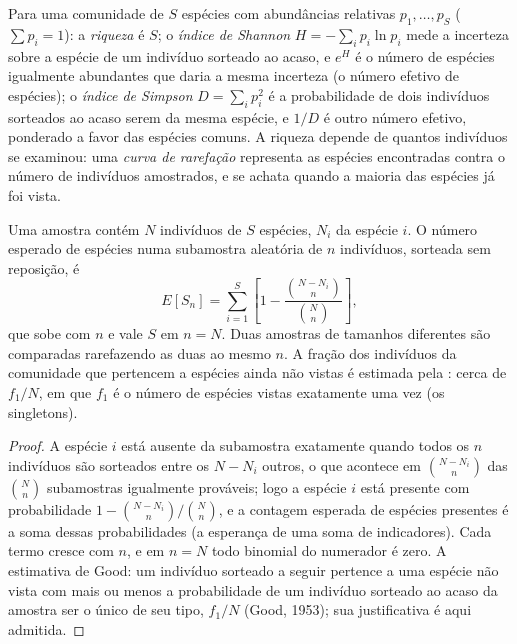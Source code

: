 \begin{definition}[Diversidade]\label{def:b3:microbiomes:diversity}
Para uma comunidade de $S$ espécies com abundâncias relativas
$p_{1},\dots,
p_{S}$ ($\sum p_{i} = 1$): a \emph{riqueza} é $S$; o
\emph{índice de Shannon} $H = -\sum_{i} p_{i}\ln p_{i}$ mede a
incerteza sobre a espécie de um indivíduo sorteado ao acaso, e $e^{H}$
é o número de espécies igualmente abundantes que daria a mesma
incerteza (o número efetivo de espécies); o \emph{índice de Simpson}
$D = \sum_{i} p_{i}^{2}$ é a probabilidade de dois indivíduos sorteados
ao acaso serem da mesma espécie, e $1/D$ é outro número efetivo,
ponderado a favor das espécies comuns. A riqueza depende de quantos
indivíduos se examinou: uma \emph{curva de rarefação} representa as
espécies encontradas contra o número de indivíduos amostrados, e se
achata quando a maioria das espécies já foi vista.
\end{definition}

\begin{theorem}[Rarefação]\label{thm:b3:microbiomes:rarefaction}
Uma amostra contém $N$ indivíduos de $S$ espécies, $N_{i}$ da espécie
$i$. O número esperado de espécies numa subamostra aleatória de $n$
indivíduos, sorteada sem reposição, é
\[
E[S_{n}] = \sum_{i=1}^{S}\left[1 - \frac{\binom{N - N_{i}}{n}}
{\binom{N}{n}}\right],
\]
que sobe com $n$ e vale $S$ em $n = N$. Duas amostras de tamanhos
diferentes são comparadas rarefazendo as duas ao mesmo $n$. A fração
dos indivíduos da comunidade que pertencem a espécies ainda não vistas
é estimada pela \emph{}: cerca de $f_{1}/N$, em que
$f_{1}$ é o número de espécies vistas exatamente uma vez (os
singletons).
\end{theorem}
\begin{proof}
A espécie $i$ está ausente da subamostra exatamente quando todos os $n$
indivíduos são sorteados entre os $N - N_{i}$ outros, o que acontece em
$\binom{N - N_{i}}{n}$ das $\binom{N}{n}$ subamostras igualmente
prováveis; logo a espécie $i$ está presente com probabilidade
$1 - \binom{N-N_{i}}{n}/
\binom{N}{n}$, e a contagem esperada de espécies
presentes é a soma dessas probabilidades (a esperança de uma soma de
indicadores). Cada termo cresce com $n$, e em $n = N$ todo binomial do
numerador é zero. A estimativa de Good: um indivíduo sorteado a seguir
pertence a uma espécie não vista com mais ou menos a probabilidade de
um indivíduo sorteado ao acaso da amostra ser o único de seu tipo,
$f_{1}/N$ (Good, 1953); sua justificativa é aqui admitida.
\end{proof}

